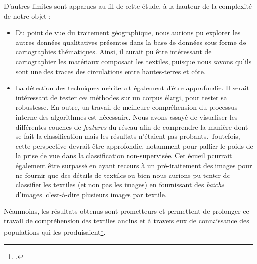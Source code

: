 \noindent D'autres limites sont apparues au fil de cette étude, à la hauteur de la complexité de notre objet : 
\begin{itemize}
	\item Du point de vue du traitement géographique, nous aurions pu explorer les autres données qualitatives présentes dans la base de données sous forme de cartographies thématiques. Ainsi, il aurait pu être intéressant de cartographier les matériaux composant les textiles, puisque nous savons qu'ils sont une des traces des circulations entre hautes-terres et côte. 
	\item La détection des techniques mériterait également d'être approfondie. Il serait intéressant de tester ces méthodes sur un corpus élargi, pour tester sa robustesse. En outre, un travail de meilleure compréhension du processus interne des algorithmes est nécessaire. Nous avons essayé de visualiser les différentes couches de \textit{features} du réseau afin de comprendre la manière dont se fait la classification mais les résultats n'étaient pas probants. Toutefois, cette perspective devrait être approfondie, notamment pour pallier le poids de la prise de vue dans la classification non-supervisée. Cet écueil pourrait également être surpassé en ayant recours à un pré-traitement des images pour ne fournir que des détails de textiles ou bien nous aurions pu tenter de classifier les textiles (et non pas les images) en fournissant des \textit{batchs} d'images, c'est-à-dire plusieurs images par textile.
\end{itemize}

Néanmoins, les résultats obtenus sont prometteurs et permettent de prolonger ce travail de compréhension des textiles andins et à travers eux de connaissance des populations qui les produisaient\footcite[p.~109]{conklinStructureMeaningAndean1997}. 




